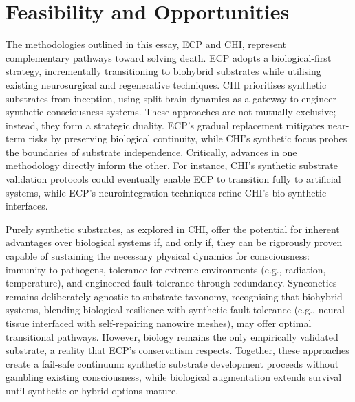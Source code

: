 \documentclass[10pt]{article}
\begin{document}
\begin{sloppypar}

  \section{Feasibility and Opportunities}
  \label{sec:feasibility}

  The methodologies outlined in this essay, ECP and CHI, represent complementary pathways toward solving death. ECP adopts a biological-first strategy, incrementally transitioning to biohybrid substrates while utilising existing neurosurgical and regenerative techniques. CHI prioritises synthetic substrates from inception, using split-brain dynamics as a gateway to engineer synthetic consciousness systems. These approaches are not mutually exclusive; instead, they form a strategic duality. ECP’s gradual replacement mitigates near-term risks by preserving biological continuity, while CHI’s synthetic focus probes the boundaries of substrate independence. Critically, advances in one methodology directly inform the other. For instance, CHI’s synthetic substrate validation protocols could eventually enable ECP to transition fully to artificial systems, while ECP’s neurointegration techniques refine CHI’s bio-synthetic interfaces.


  Purely synthetic substrates, as explored in CHI, offer the potential for inherent advantages over biological systems if, and only if, they can be rigorously proven capable of sustaining the necessary physical dynamics for consciousness: immunity to pathogens, tolerance for extreme environments (e.g., radiation, temperature), and engineered fault tolerance through redundancy. Synconetics remains deliberately agnostic to substrate taxonomy, recognising that biohybrid systems, blending biological resilience with synthetic fault tolerance (e.g., neural tissue interfaced with self-repairing nanowire meshes), may offer optimal transitional pathways. However, biology remains the only empirically validated substrate, a reality that ECP’s conservatism respects. Together, these approaches create a fail-safe continuum: synthetic substrate development proceeds without gambling existing consciousness, while biological augmentation extends survival until synthetic or hybrid options mature.


\end{sloppypar}
\end{document}
